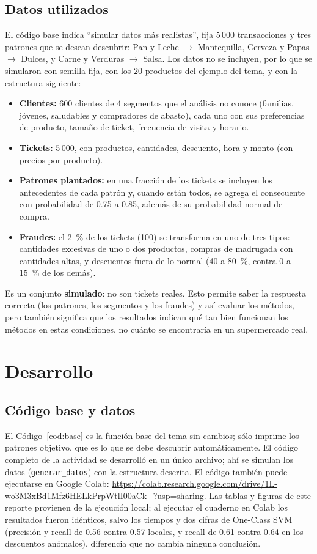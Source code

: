 \documentclass[11pt,letterpaper]{article}
\begin{document}
\subsection*{Datos utilizados}

El código base indica ``simular datos más realistas'', fija 5\,000 transacciones y tres patrones que se desean descubrir: Pan y Leche $\rightarrow$ Mantequilla, Cerveza y Papas $\rightarrow$ Dulces, y Carne y Verduras $\rightarrow$ Salsa. Los datos no se incluyen, por lo que se simularon con semilla fija, con los 20 productos del ejemplo del tema, y con la estructura siguiente:
\begin{itemize}
    \item \textbf{Clientes:} 600 clientes de 4 segmentos que el análisis no conoce (familias, jóvenes, saludables y compradores de abasto), cada uno con sus preferencias de producto, tamaño de ticket, frecuencia de visita y horario.
    \item \textbf{Tickets:} 5\,000, con productos, cantidades, descuento, hora y monto (con precios por producto).
    \item \textbf{Patrones plantados:} en una fracción de los tickets se incluyen los antecedentes de cada patrón y, cuando están todos, se agrega el consecuente con probabilidad de 0.75 a 0.85, además de su probabilidad normal de compra.
    \item \textbf{Fraudes:} el 2~\% de los tickets (100) se transforma en uno de tres tipos: cantidades excesivas de uno o dos productos, compras de madrugada con cantidades altas, y descuentos fuera de lo normal (40 a 80~\%, contra 0 a 15~\% de los demás).
\end{itemize}
Es un conjunto \textbf{simulado}: no son tickets reales. Esto permite saber la respuesta correcta (los patrones, los segmentos y los fraudes) y así evaluar los métodos, pero también significa que los resultados indican qué tan bien funcionan los métodos en estas condiciones, no cuánto se encontraría en un supermercado real.

\section{Desarrollo}

\subsection{Código base y datos}

El Código~\ref{cod:base} es la función base del tema sin cambios; sólo imprime los patrones objetivo, que es lo que se debe descubrir automáticamente. El código completo de la actividad se desarrolló en un único archivo; ahí se simulan los datos (\texttt{generar\_datos}) con la estructura descrita. El código también puede ejecutarse en Google Colab: \url{https://colab.research.google.com/drive/1L-wo3M3xBd1Mfz6HELkPrpWtlI00aCk_?usp=sharing}. Las tablas y figuras de este reporte provienen de la ejecución local; al ejecutar el cuaderno en Colab los resultados fueron idénticos, salvo los tiempos y dos cifras de One-Class SVM (precisión y recall de 0.56 contra 0.57 locales, y recall de 0.61 contra 0.64 en los descuentos anómalos), diferencia que no cambia ninguna conclusión.
\end{document}
